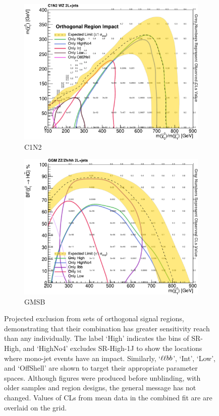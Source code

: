 \begin{figure}[tp]
\centering
\begin{subfigure}{0.48\textwidth}
\centering
\includegraphics[width=\textwidth]{figures/2ljets_fit_multi_contours_c1n2.pdf}
\caption{C1N2}
\end{subfigure}
\hfill
\begin{subfigure}{0.48\textwidth}
\centering
\includegraphics[width=\textwidth]{figures/2ljets_fit_multi_contours_gmsb.pdf}
\caption{GMSB}
\end{subfigure}
\caption[
Projected exclusion from sets of orthogonal signal regions
]{%
Projected exclusion from sets of orthogonal signal regions, demonstrating that
their combination has greater sensitivity reach than any individually.
The label `High' indicates the bins of SR-High, and `HighNo4' excludes
SR-High-1J to show the locations where mono-jet events have an impact.
Similarly, `$\ell\ell bb$', `Int', `Low', and `OffShell' are shown to target their
appropriate parameter spaces.
Although figures were produced before unblinding, with older samples and region
designs, the general message has not changed.
Values of CLs from mean data in the combined fit are are overlaid on the grid.
}
\label{fig:2ljets_fit_muti_contourss}
\end{figure}
